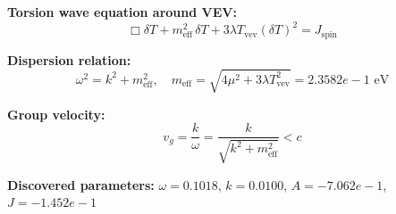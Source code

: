 
\textbf{Torsion wave equation around VEV:}
\begin{equation}
  \Box \delta T + m_{\text{eff}}^2 \, \delta T + 3\lambda T_{\text{vev}} (\delta T)^2 = J_{\text{spin}}
\end{equation}

\textbf{Dispersion relation:}
\begin{equation}
  \omega^2 = k^2 + m_{\text{eff}}^2, \quad
  m_{\text{eff}} = \sqrt{4\mu^2 + 3\lambda T_{\text{vev}}^2} = 2.3582e-1 \text{ eV}
\end{equation}

\textbf{Group velocity:}
\begin{equation}
  v_g = \frac{k}{\omega} = \frac{k}{\sqrt{k^2 + m_{\text{eff}}^2}} < c
\end{equation}

\textbf{Discovered parameters:}
$\omega = 0.1018$, \quad
$k = 0.0100$, \quad
$A = -7.062e-1$, \quad
$J = -1.452e-1$